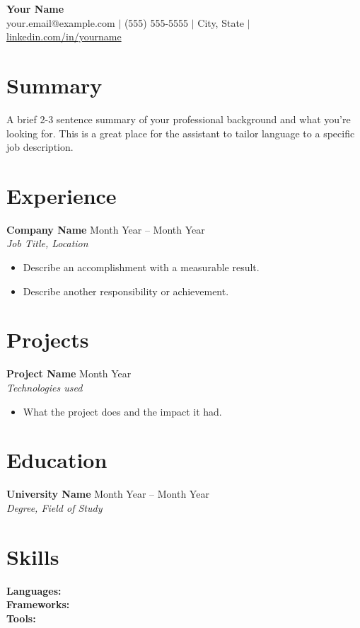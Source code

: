 \documentclass[11pt]{article}
\newcommand{\resumeItem}[1]{\item #1}
\newcommand{\resumeEntry}[3]{
  \textbf{#1} \hfill #2 \\
  \textit{#3}
}
\begin{document}
\begin{center}
  {\LARGE \textbf{Your Name}} \\
  \vspace{2pt}
  your.email@example.com \; $\vert$ \; (555) 555-5555 \; $\vert$ \; City, State \; $\vert$ \; \href{https://linkedin.com/in/yourname}{linkedin.com/in/yourname}
\end{center}

\section*{Summary}
A brief 2-3 sentence summary of your professional background and what you're looking for. This is a great place for the assistant to tailor language to a specific job description.

\section*{Experience}
\resumeEntry{Company Name}{Month Year -- Month Year}{Job Title, Location}
\begin{itemize}[leftmargin=1.2em, itemsep=1pt, topsep=2pt]
  \resumeItem{Describe an accomplishment with a measurable result.}
  \resumeItem{Describe another responsibility or achievement.}
\end{itemize}

\section*{Projects}
\resumeEntry{Project Name}{Month Year}{Technologies used}
\begin{itemize}[leftmargin=1.2em, itemsep=1pt, topsep=2pt]
  \resumeItem{What the project does and the impact it had.}
\end{itemize}

\section*{Education}
\resumeEntry{University Name}{Month Year -- Month Year}{Degree, Field of Study}

\section*{Skills}
\textbf{Languages:} \\
\textbf{Frameworks:} \\
\textbf{Tools:}
\end{document}
